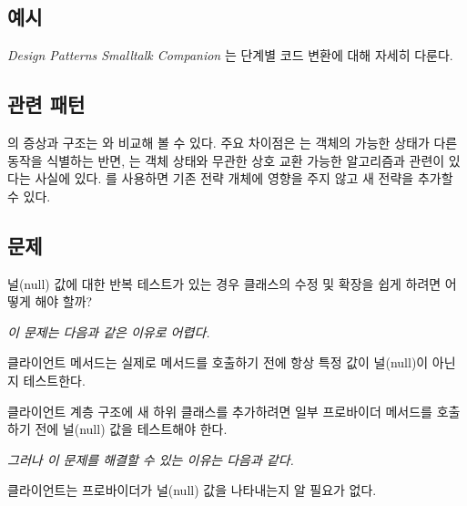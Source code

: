 \documentclass[a4paper,10pt,twoside]{book}
\begin{document}
\subsection*{예시}

\emph{Design Patterns Smalltalk Companion} \cite{Alpe98a}는 단계별 코드 변환에 대해 자세히 다룬다.

\subsection*{관련 패턴}

의 증상과 구조는 와 비교해 볼 수 있다. 주요 차이점은 는 객체의 가능한 상태가 다른 동작을 식별하는 반면, 는 객체 상태와 무관한 상호 교환 가능한 알고리즘과 관련이 있다는 사실에 있다. 를 사용하면 기존 전략 개체에 영향을 주지 않고 새 전략을 추가할 수 있다.




\subsection*{문제}

널(null) 값에 대한 반복 테스트가 있는 경우 클래스의 수정 및 확장을 쉽게 하려면 어떻게 해야 할까?

\emph{이 문제는 다음과 같은 이유로 어렵다.}

\begin{bulletlist}
\item 클라이언트 메서드는 실제로 메서드를 호출하기 전에 항상 특정 값이 널(null)이 아닌지 테스트한다.

\item 클라이언트 계층 구조에 새 하위 클래스를 추가하려면 일부 프로바이더 메서드를 호출하기 전에 널(null) 값을 테스트해야 한다.
\end{bulletlist}

\emph{그러나 이 문제를 해결할 수 있는 이유는 다음과 같다.}

\begin{bulletlist}
\item 클라이언트는 프로바이더가 널(null) 값을 나타내는지 알 필요가 없다.
\end{bulletlist}
\end{document}
